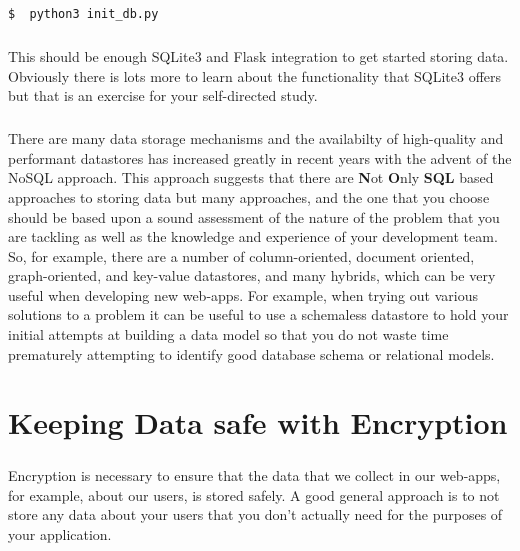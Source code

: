 \documentclass[12pt, a4paper, oneside]{book}
\begin{document}
\begin{lstlisting}[style=DOS]
$  python3 init_db.py
\end{lstlisting}

\paragraph{} This should be enough SQLite3 and Flask integration to get started storing data. Obviously there is lots more to learn about the functionality that SQLite3 offers but that is an exercise for your self-directed study.

\paragraph{} There are many data storage mechanisms and the availabilty of high-quality and performant datastores has increased greatly in recent years with the advent of the NoSQL approach. This approach suggests that there are {\bf{N}}ot {\bf{O}}nly {\bf{SQL}} based approaches to storing data but many approaches, and the one that you choose should be based upon a sound assessment of the nature of the problem that you are tackling as well as the knowledge and experience of your development team. So, for example, there are a number of column-oriented, document oriented, graph-oriented, and key-value datastores, and many hybrids, which can be very useful when developing new web-apps. For example, when trying out various solutions to a problem it can be useful to use a schemaless datastore to hold your initial attempts at building a data model so that you do not waste time prematurely attempting to identify good database schema or relational models. 


\chapter{Keeping Data safe with Encryption}
\label{lab09}
\paragraph{} Encryption is necessary to ensure that the data that we collect in our web-apps, for example, about our users, is stored safely. A good general approach is to not store any data about your users that you don't actually need for the purposes of your application.
\end{document}
